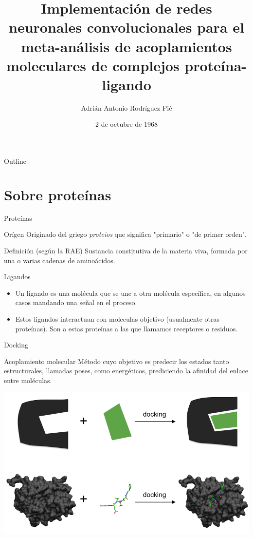 \documentclass[presentation]{beamer}
\institute{Universidad Nacional Autónoma de México}
\author{Adrián Antonio Rodríguez Pié}
\date{2 de octubre de 1968}
\title{Implementación de redes neuronales convolucionales para el meta-análisis de acoplamientos moleculares de complejos proteína-ligando}
\begin{document}
\maketitle
\begin{frame}{Outline}
\tableofcontents
\end{frame}



\section{Sobre proteínas}
\label{sec:org2006072}
\begin{frame}[label={sec:orgfe9d83e}]{Proteínas}
\begin{block}{Orígen}
Originado del griego \emph{proteios} que significa "primario"
o "de primer orden".
\pause
\end{block}
\begin{block}{Definición (según la \alert{RAE})}
Sustancia constitutiva de la materia viva, formada
por una o varias cadenas de aminoácidos.
\end{block}
\end{frame}
\begin{frame}[label={sec:org5c513d5}]{Ligandos}
\begin{itemize}
\item Un \alert{ligando} es una molécula que se une a otra molécula específica, en algunos casos mandando una señal en el proceso.
\pause
\item Estos ligandos interactuan con moleculas objetivo (usualmente otras proteínas). Son a estas proteínas a las que llamamos \alert{receptores} o \alert{residuos}.
\end{itemize}
\end{frame}
\begin{frame}[label={sec:orgffa772d}]{Docking}
\begin{block}{Acoplamiento molecular}
Método cuyo objetivo es predecir los estados tanto estructurales,
llamadas \alert{poses}, como energéticos, prediciendo la afinidad del enlace
entre moléculas.
\begin{center}
\includegraphics[width=.9\linewidth]{images/docking.png}
\end{center}
\end{block}
\end{frame}
\end{document}
